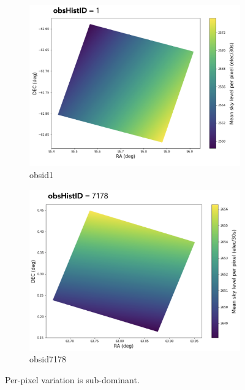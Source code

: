 \begin{figure}
\centering
\begin{subfigure}[b]{.5\textwidth}
  \centering
  \includegraphics[width=\textwidth]{images/sensors/perpixel1.jpg}
  \caption{obsid1}
  \label{fig:sub1}
\end{subfigure}%
\begin{subfigure}[b]{.5\textwidth}
  \centering
  \includegraphics[width=\textwidth]{images/sensors/perpixel2.jpg}
  \caption{obsid7178}
  \label{fig:sub2}
\end{subfigure}
\caption{Per-pixel variation is sub-dominant.}
\label{fig:skymodel3}
\end{figure}

